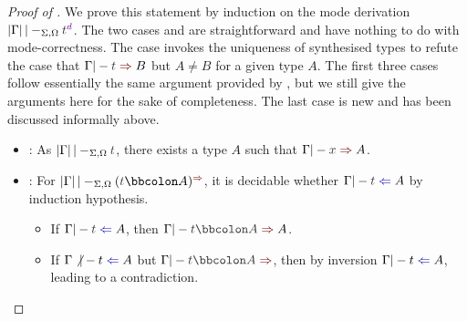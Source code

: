 \begin{proof}[Proof of {}]
  We prove this statement by induction on the mode derivation\/ $\erase{\Gamma} |-_{\Sigma, \Omega} \isTerm{t}^{\dir{d}}$.
  The two cases  and  are straightforward and have nothing to do with mode-correctness.
  The case  invokes the uniqueness of synthesised types to refute the case that $\Gamma |- \isTerm{t} \syn B$ but $A \neq B$ for a given type $A$.
  The first three cases follow essentially the same argument provided by \citet{Wadler2022}, but we still give the arguments here for the sake of completeness.
  The last case  is new and has been discussed informally above.
  \begin{itemize}
    \item {}: As $\erase{\Gamma} |-_{\Sigma, \Omega} \isTerm{t}$, there exists a type $A$ such that $\Gamma |- \isTerm{x} \syn A$.

    \item {}: For $\erase{\Gamma} |-_{\Sigma, \Omega} (\isTerm{t} \annotate A)^{\syn}$, it is decidable whether $\Gamma |- \isTerm{t} \chk A$ by induction hypothesis.
      \begin{itemize}
        \item If $\Gamma |- \isTerm{t} \chk A$, then $\Gamma |- \isTerm{t \annotate A} \syn A$.
        \item If $\Gamma \not|- t \chk A$ but $\Gamma |- \isTerm{t \annotate A} \syn$, then by inversion $\Gamma |- t \chk A$, leading to a contradiction.
      \end{itemize}
      

\end{itemize}
\end{proof}
